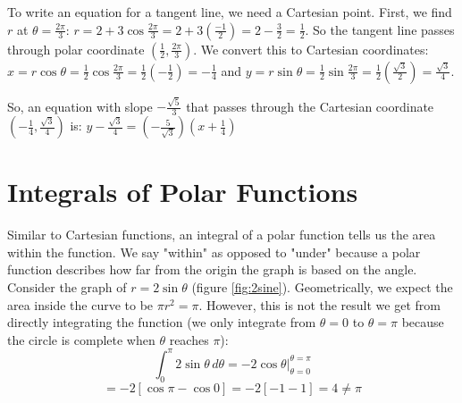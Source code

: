 \begin{Answer}[ref = polar3]
\begin{enumerate}
To write an equation for a tangent line, we need a Cartesian point. First, we 
find $r$ at $\theta = \frac{2\pi}{3}$: $r = 2 + 3\cos{\frac{2\pi}{3}} = 2 + 3 
\left( \frac{-1}{2}\right) = 2 - \frac{3}{2} = \frac{1}{2}$. So the tangent 
line passes through polar coordinate $\left( \frac{1}{2}, \frac{2\pi}{3} 
\right)$. We convert this to Cartesian coordinates: $x = r \cos{\theta} = 
\frac{1}{2} \cos{\frac{2\pi}{3}} = \frac{1}{2} \left(-\frac{1}{2} \right) = -
\frac{1}{4}$ and $y = r \sin{\theta} = \frac{1}{2} \sin{\frac{2\pi}{3}} = 
\frac{1}{2} \left( \frac{\sqrt{3}}{2}\right) = \frac{\sqrt{3}}{4}$. 

So, an equation with slope $-\frac{\sqrt{5}}{3}$ that passes through the 
Cartesian coordinate $\left( -\frac{1}{4}, \frac{\sqrt{3}}{4}\right)$ is: $y - 
\frac{\sqrt{3}}{4} = \left( -\frac{5}{\sqrt{3}} \right) \left(x + \frac{1}{4} 
\right)$
\end{enumerate}
\end{Answer}

\section{Integrals of Polar Functions}
Similar to Cartesian functions, an integral of a polar function tells us the 
area within the function. We say "within" as opposed to "under" because a 
polar function describes how far from the origin the graph is based on the 
angle. Consider the graph of $r = 2\sin{\theta}$ (figure \ref{fig:2sine}). 
Geometrically, we expect the area inside the curve to be $\pi r^2 = \pi$. 
However, this is not the result we get from directly integrating the function 
(we only integrate from $\theta = 0$ to $\theta = \pi$ because the circle is 
complete when $\theta$ reaches $\pi$): 
$$\int_0^{\pi} 2\sin{\theta}\,d\theta = -2\cos{\theta}|_{\theta = 0}^{\theta 
= \pi}$$
$$= -2 \left[ \cos{\pi} - \cos{0} \right] = -2 \left[ -1 - 1 \right] = 4 \neq 
\pi$$

